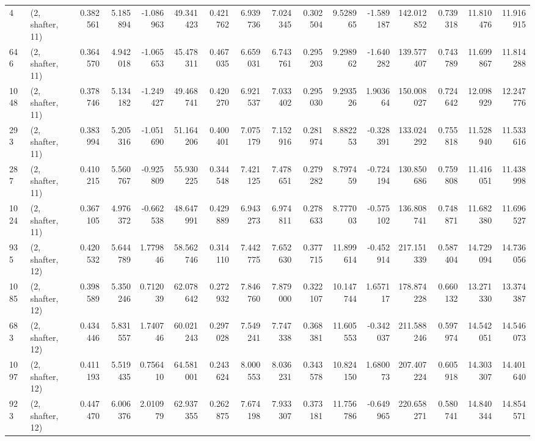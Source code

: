 \begin{tabular}{llrrrrrrrrrrrrrr}
4    &  (2, shafter, 11) &   0.382561 &   5.185894 &  -1.086963 &     49.341423 &    0.421762 &    6.939736 &    7.024345 &  0.302504 &   9.528965 &  -1.589187 &   142.012852 &   0.739318 &  11.810476 &  11.916915 \\
646  &  (2, shafter, 11) &   0.364570 &   4.942018 &  -1.065653 &     45.478311 &    0.467035 &    6.659031 &    6.743761 &  0.295203 &   9.298962 &  -1.640282 &   139.577407 &   0.743789 &  11.699867 &  11.814288 \\
1048 &  (2, shafter, 11) &   0.378746 &   5.134182 &  -1.249427 &     49.468741 &    0.420270 &    6.921537 &    7.033402 &  0.295030 &   9.293526 &   1.903664 &   150.008027 &   0.724642 &  12.098929 &  12.247776 \\
293  &  (2, shafter, 11) &   0.383994 &   5.205316 &  -1.051690 &     51.164206 &    0.400401 &    7.075179 &    7.152916 &  0.281974 &   8.882253 &  -0.328391 &   133.024292 &   0.755818 &  11.528940 &  11.533616 \\
287  &  (2, shafter, 11) &   0.410215 &   5.560767 &  -0.925809 &     55.930225 &    0.344548 &    7.421125 &    7.478651 &  0.279282 &   8.797459 &  -0.724194 &   130.850686 &   0.759808 &  11.416051 &  11.438998 \\
1024 &  (2, shafter, 11) &   0.367105 &   4.976372 &  -0.662538 &     48.647991 &    0.429889 &    6.943273 &    6.974811 &  0.278633 &   8.777003 &  -0.575102 &   136.808741 &   0.748871 &  11.682380 &  11.696527 \\
935  &  (2, shafter, 12) &   0.420532 &   5.644789 &   1.779846 &     58.562746 &    0.314110 &    7.442775 &    7.652630 &  0.377715 &  11.899614 &  -0.452914 &   217.151339 &   0.587404 &  14.729094 &  14.736056 \\
1085 &  (2, shafter, 12) &   0.398589 &   5.350246 &   0.712039 &     62.078642 &    0.272932 &    7.846760 &    7.879000 &  0.322107 &  10.147744 &   1.657117 &   178.874228 &   0.660132 &  13.271330 &  13.374387 \\
683  &  (2, shafter, 12) &   0.434446 &   5.831557 &   1.740746 &     60.021243 &    0.297028 &    7.549241 &    7.747338 &  0.368381 &  11.605553 &  -0.342037 &   211.588246 &   0.597974 &  14.542051 &  14.546073 \\
1097 &  (2, shafter, 12) &   0.411193 &   5.519435 &   0.756410 &     64.581001 &    0.243624 &    8.000553 &    8.036231 &  0.343578 &  10.824150 &   1.680073 &   207.407224 &   0.605918 &  14.303307 &  14.401640 \\
923  &  (2, shafter, 12) &   0.447470 &   6.006376 &   2.010979 &     62.937355 &    0.262875 &    7.674198 &    7.933307 &  0.373181 &  11.756786 &  -0.649965 &   220.658271 &   0.580741 &  14.840344 &  14.854571 \\

\end{tabular}
